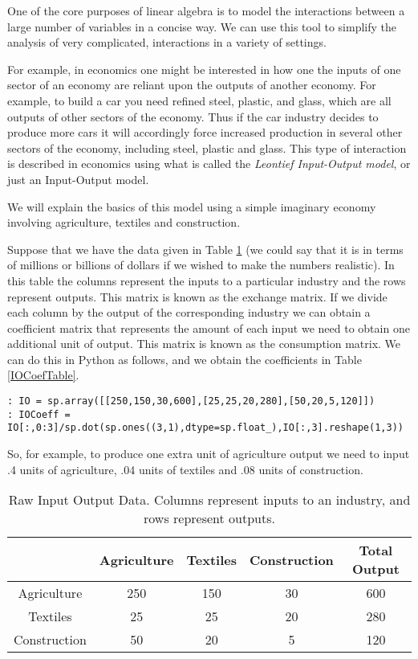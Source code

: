 \label{Leontief}


One of the core purposes of linear algebra is to model the interactions between a large number of variables in a concise way. We can use this tool to simplify the analysis of very complicated, interactions in a variety of settings.

For example, in economics one might be interested in how one the inputs of one sector of an economy are reliant upon the outputs of another economy. For example, to build a car you need refined steel, plastic, and glass, which are all outputs of other sectors of the economy. Thus if the car industry decides to produce more cars it will accordingly force increased production in several other sectors of the economy, including steel, plastic and glass. This type of interaction is described in economics using what is called the \emph{Leontief Input-Output model}, or just an Input-Output model.

We will explain the basics of this model using a simple imaginary economy involving agriculture, textiles and construction.

Suppose that we have the data given in Table \ref{IORawTable} (we could say that it is in terms of millions or billions of dollars if we wished to make the numbers realistic). In this table the columns represent the inputs to a particular industry and the rows represent outputs. This matrix is known as the exchange matrix. If we divide each column by the output of the corresponding industry we can obtain a coefficient matrix that represents the amount of each input we need to obtain one additional unit of output. This matrix is known as the consumption matrix. We can do this in Python as follows, and we obtain the coefficients in Table \ref{IOCoefTable}.

\begin{lstlisting}[style=python]
: IO = sp.array([[250,150,30,600],[25,25,20,280],[50,20,5,120]])
: IOCoeff = IO[:,0:3]/sp.dot(sp.ones((3,1),dtype=sp.float_),IO[:,3].reshape(1,3))
\end{lstlisting}
So, for example, to produce one extra unit of agriculture output we need to input .4 units of agriculture, .04 units of textiles and .08 units of construction.

\begin{table}
\begin{center}
\begin{tabular}{|c|c|c|c|c|}
\hline
& Agriculture & Textiles & Construction & Total Output \\ \hline
Agriculture & 250 & 150 & 30 & 600 \\ \hline
Textiles & 25 & 25 & 20 & 280 \\ \hline
Construction & 50 & 20 & 5 & 120 \\ \hline
\end{tabular}
\caption{Raw Input Output Data. Columns represent inputs to an industry, and rows represent outputs.}  \label{IORawTable}
\end{center}
\end{table}

